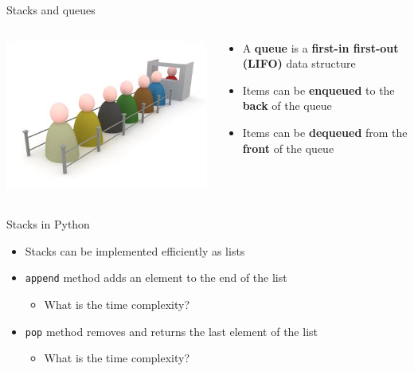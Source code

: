 \begin{frame}{Stacks and queues}
\begin{columns}
\begin{column}{0.3\textwidth}
			\includegraphics[width=\textwidth]{queue}
		\end{column}
		\begin{column}{0.68\textwidth}
			\begin{itemize}
				\item A \textbf{queue} is a \textbf{first-in first-out (LIFO)} data structure
				\pause\item Items can be \textbf{enqueued} to the \textbf{back} of the queue
				\pause\item Items can be \textbf{dequeued} from the \textbf{front} of the queue
			\end{itemize}
		\end{column}
	\end{columns}
\end{frame}

\begin{frame}{Stacks in Python}
	\begin{itemize}
		\pause\item Stacks can be implemented efficiently as lists
		\pause\item \lstinline{append} method adds an element to the end of the list
			\begin{itemize}
				\pause\item What is the time complexity?
			\end{itemize}
		\pause\item \lstinline{pop} method removes and returns the last element of the list
			\begin{itemize}
				\pause\item What is the time complexity?
			\end{itemize}
	\end{itemize}
\end{frame}

